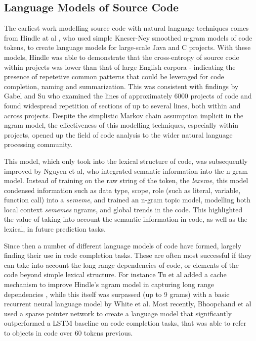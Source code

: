 \subsection{Language Models of Source Code}

The earliest work modelling source code with natural language techniques comes from Hindle at al \cite{hindle_naturalness_nodate}, who used simple Kneser-Ney smoothed n-gram models of code tokens, to create language models for large-scale Java and C projects.
With these models, Hindle was able to demonstrate that the cross-entropy of source code within projects was lower than that of large English corpora - indicating the presence of repetetive common patterns that could be leveraged for code completion, naming and summarization.
This was consistent with findings by Gabel and Su \cite{gabel_study_2010} who examined the lines of approximately 6000 projects of code and found widespread repetition of sections of up to several lines, both within and across projects.
Despite the simplistic Markov chain assumption implicit in the ngram model, the effectiveness of this modelling techniques, especially within projects, opened up the field of code analysis to the wider natural language processing community.

This model, which only took into the lexical structure of code, was subsequently improved by Nguyen et al\cite{nguyen_statistical_2013}, who integrated semantic information into the n-gram model.
Instead of training on the raw string of the token, the \textit{lexeme}, this model condensed information such as data type, scope, role (such as literal, variable, function call) into a \textit{sememe}, and trained an n-gram topic model, modelling both local context \textit{sememes} ngrams, and global trends in the code.
This highlighted the value of taking into account the semantic information in code, as well as the lexical, in future prediction tasks.

Since then a number of different language models of code have formed, largely finding their use in code completion tasks. These are often most successful if they can take into account the long range dependencies of code, or elements of the code beyond simple lexical structure. For instance Tu et al added a cache mechanism to improve Hindle's ngram model in capturing long range dependencies  \cite{tu_localness_nodate}, while this itself was surpassed (up to 9 grams) with a basic recurrent neural language model by White et al\cite{white_toward_2015}.
Most recently, Bhoopchand et al used a sparse pointer network to create a language model that significantly outperformed a LSTM baseline on code completion tasks, that was able to refer to objects in code over 60 tokens previous\cite{bhoopchand_learning_2016}.

